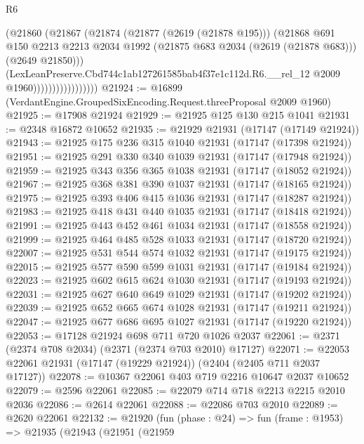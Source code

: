 \begin{lexlean}{R6}
\begin{coremodule}
                                (@21860
                                  (@21867
                                    (@21874
                                      (@21877 (@2619 (@21878 @195)))
                                      (@21868
                                        @691
                                        @150
                                        @2213
                                        @2213
                                        @2034
                                        @1992
                                        (@21875 @683 @2034 (@2619 (@21878 @683)))
                                        (@2649 @21850)))
                                    (LexLeanPreserve.Cbd744c1ab127261585bab4f37e1c112d.R6.__rel_12
                                      @2009
                                      @1960)))))))))))))))))
@21924 := @16899 (VerdantEngine.GroupedSixEncoding.Request.threeProposal @2009 @1960)
@21925 := @17908 @21924
@21929 := @21925 @125 @130 @215 @1041
@21931 := @2348 @16872 @10652
@21935 := @21929 @21931 (@17147 (@17149 @21924))
@21943 := @21925 @175 @236 @315 @1040 @21931 (@17147 (@17398 @21924))
@21951 := @21925 @291 @330 @340 @1039 @21931 (@17147 (@17948 @21924))
@21959 := @21925 @343 @356 @365 @1038 @21931 (@17147 (@18052 @21924))
@21967 := @21925 @368 @381 @390 @1037 @21931 (@17147 (@18165 @21924))
@21975 := @21925 @393 @406 @415 @1036 @21931 (@17147 (@18287 @21924))
@21983 := @21925 @418 @431 @440 @1035 @21931 (@17147 (@18418 @21924))
@21991 := @21925 @443 @452 @461 @1034 @21931 (@17147 (@18558 @21924))
@21999 := @21925 @464 @485 @528 @1033 @21931 (@17147 (@18720 @21924))
@22007 := @21925 @531 @544 @574 @1032 @21931 (@17147 (@19175 @21924))
@22015 := @21925 @577 @590 @599 @1031 @21931 (@17147 (@19184 @21924))
@22023 := @21925 @602 @615 @624 @1030 @21931 (@17147 (@19193 @21924))
@22031 := @21925 @627 @640 @649 @1029 @21931 (@17147 (@19202 @21924))
@22039 := @21925 @652 @665 @674 @1028 @21931 (@17147 (@19211 @21924))
@22047 := @21925 @677 @686 @695 @1027 @21931 (@17147 (@19220 @21924))
@22053 := @17128 @21924 @698 @711 @720 @1026 @2037
@22061 := @2371 (@2374 @708 @2034) (@2371 (@2374 @703 @2010) @17127)
@22071 := @22053 @22061 @21931 (@17147 (@19229 @21924)) (@2404 (@2405 @711 @2037 @17127))
@22078 := @10367 @22061 @403 @719 @2216 @10647 @2037 @10652
@22079 := @2596 @22061
@22085 := @22079 @714 @718 @2213 @2215 @2010 @2036
@22086 := @2614 @22061
@22088 := @22086 @703 @2010
@22089 := @2620 @22061
@22132 := @21920
    (fun (phase : @24) =>
    fun (frame : @1953) =>
    @21935
      (@21943
        (@21951
          (@21959

\end{coremodule}
\end{lexlean}
